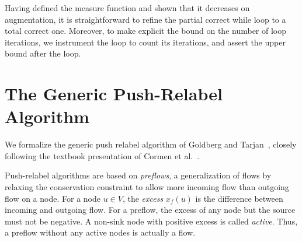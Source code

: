 \documentclass[smallcondensed]{svjour3}     %
\begin{document}
%   
%   
%   
  
  Having defined the measure function and shown that it decreases on augmentation, it is straightforward to refine the partial correct while loop to a total correct one. Moreover, to make explicit the bound on the number of loop iterations, we instrument the loop to count its iterations, and assert the upper bound after the loop.


\section{The Generic Push-Relabel Algorithm}\label{sec:gen-prpu}
  We formalize the generic push relabel algorithm of Goldberg and Tarjan~\cite{GoTa88},
  closely following the textbook presentation of Cormen et al.~\cite{CLRS09}.
  
  Push-relabel algorithms are based on \emph{preflows}, a generalization of flows
  by relaxing the conservation constraint to allow more incoming flow than outgoing flow on a node.
  For a node $u\in V$, the \emph{excess} $x_f(u)$ is the difference between incoming and outgoing flow. 
  For a preflow, the excess of any node but the source must not be negative.
  A non-sink node with positive excess is called \emph{active}. Thus, a preflow without any active nodes is actually a flow.
  
\end{document}
